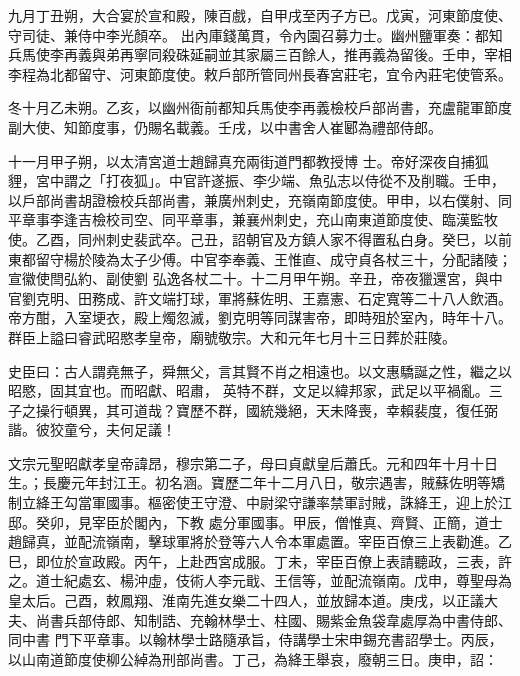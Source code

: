 \begin{pinyinscope}
 九月丁丑朔，大合宴於宣和殿，陳百戲，自甲戌至丙子方已。戊寅，河東節度使、守司徒、兼侍中李光顏卒。
 出內庫錢萬貫，令內園召募力士。幽州鹽軍奏：都知兵馬使李再義與弟再寧同殺硃延嗣並其家屬三百餘人，推再義為留後。壬申，宰相李程為北都留守、河東節度使。敕戶部所管同州長春宮莊宅，宜令內莊宅使管系。



 冬十月乙未朔。乙亥，以幽州衙前都知兵馬使李再義檢校戶部尚書，充盧龍軍節度副大使、知節度事，仍賜名載義。壬戌，以中書舍人崔郾為禮部侍郎。



 十一月甲子朔，以太清宮道士趙歸真充兩街道門都教授博
 士。帝好深夜自捕狐貍，宮中謂之「打夜狐」。中官許遂振、李少端、魚弘志以侍從不及削職。壬申，以戶部尚書胡證檢校兵部尚書，兼廣州刺史，充嶺南節度使。甲申，以右僕射、同平章事李逢吉檢校司空、同平章事，兼襄州刺史，充山南東道節度使、臨漢監牧使。乙酉，同州刺史裴武卒。己丑，詔朝官及方鎮人家不得置私白身。癸巳，以前東都留守楊於陵為太子少傅。中官李奉義、王惟直、成守貞各杖三十，分配諸陵；宣徽使閆弘約、副使劉
 弘逸各杖二十。十二月甲午朔。辛丑，帝夜獵還宮，與中官劉克明、田務成、許文端打球，軍將蘇佐明、王嘉憲、石定寬等二十八人飲酒。帝方酣，入室埂衣，殿上燭忽滅，劉克明等同謀害帝，即時殂於室內，時年十八。群臣上謚曰睿武昭愍孝皇帝，廟號敬宗。大和元年七月十三日葬於莊陵。



 史臣曰：古人謂堯無子，舜無父，言其賢不肖之相遠也。以文惠驕誕之性，繼之以昭愍，固其宜也。而昭獻、昭肅，
 英特不群，文足以緯邦家，武足以平禍亂。三子之操行頓異，其可道哉？寶歷不群，國統幾絕，天未降喪，幸賴裴度，復任弼諧。彼狡童兮，夫何足議！



 文宗元聖昭獻孝皇帝諱昂，穆宗第二子，母曰貞獻皇后蕭氏。元和四年十月十日生。；長慶元年封江王。初名涵。寶歷二年十二月八日，敬宗遇害，賊蘇佐明等矯制立絳王勾當軍國事。樞密使王守澄、中尉梁守謙率禁軍討賊，誅絳王，迎上於江邸。癸卯，見宰臣於閣內，下教
 處分軍國事。甲辰，僧惟真、齊賢、正簡，道士趙歸真，並配流嶺南，擊球軍將於登等六人令本軍處置。宰臣百僚三上表勸進。乙巳，即位於宣政殿。丙午，上赴西宮成服。丁未，宰臣百僚上表請聽政，三表，許之。道士紀處玄、楊沖虛，伎術人李元戢、王信等，並配流嶺南。戊申，尊聖母為皇太后。己酉，敕鳳翔、淮南先進女樂二十四人，並放歸本道。庚戌，以正議大夫、尚書兵部侍郎、知制誥、充翰林學士、柱國、賜紫金魚袋韋處厚為中書侍郎、同中書
 門下平章事。以翰林學士路隨承旨，侍講學士宋申錫充書詔學士。丙辰，以山南道節度使柳公綽為刑部尚書。丁己，為絳王舉哀，廢朝三日。庚申，詔：




\end{pinyinscope}
